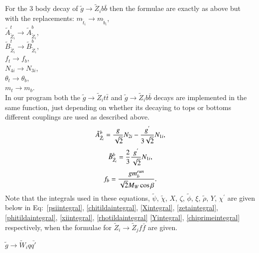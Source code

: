 \documentclass[final,3p,times]{elsarticle}
\begin{document}
For the 3 body decay of $\tilde{g} \rightarrow \tilde{Z}_i b \bar{b}$ then the formulae are exactly as above but with the replacements:
{\centering
$m_{\tilde{t}_{i}} \rightarrow m_{\tilde{b}_{i}}$, \\
$\tilde{A}^{t}_{\tilde{Z}_{i}} \rightarrow \tilde{A}^{b}_{\tilde{Z}_{i}}$, \\
$\tilde{B}^{t}_{\tilde{Z}_{i}} \rightarrow \tilde{B}^{b}_{\tilde{Z}_{i}}$, \\
$f_{t} \rightarrow f_{b}$, \\
$N_{4i} \rightarrow N_{3i}$, \\
$\theta_t \rightarrow \theta_b$, \\
$m_{t} \rightarrow m_{b}$. \\
}
In our program both the $\tilde{g} \rightarrow \tilde{Z}_i t \bar{t}$ and $\tilde{g} \rightarrow \tilde{Z}_i b \bar{b}$ decays are implemented in the same function, just depending on whether its decaying to tops or bottoms different couplings are used as described above.
\begin{equation} 
\tilde{A}^{b}_{\tilde{Z}_i} = {g \over \sqrt{2}}N_{2i} - {g^{'} \over 3 \sqrt{2}}N_{1i},
\end{equation}
\begin{equation}
\tilde{B}^{b}_{\tilde{Z}_i} = {2 \over 3}{g^{'} \over \sqrt{2}}N_{1i},
\end{equation}
\begin{equation}
f_{b} = {g m_{b}^{run} \over \sqrt{2} M_{W} \cos\beta}.
\end{equation}
Note that the integrals used in these equations, $\tilde{\psi}$, $\tilde{\chi}$, $X$, $\zeta$, $\tilde{\phi}$, $\xi$,  $\tilde{\rho}$, $Y$, $\chi^{'}$ are given below in Eq:~\eqref{psiintegral}, \eqref{chitildaintegral}, \eqref{Xintegral}, \eqref{zetaintegral}, \eqref{phitildaintegral}, \eqref{xiintegral}, \eqref{rhotildaintegral} \eqref{Yintegral}, \eqref{chiprimeintegral} respectively, when the formulae for $\tilde{Z}_i \rightarrow \tilde{Z}_j f \bar{f}$ are given.

\textbf{\underline{$\tilde{g} \rightarrow \tilde{W}_i q \bar{q'}$}}
\end{document}

